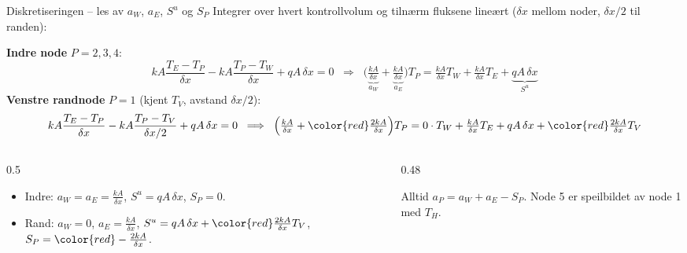 \documentclass[11pt,aspectratio=169]{beamer}
\begin{document}
\begin{frame}{Diskretiseringen -- les av $a_W$, $a_E$, $S^u$ og $S_P$}
\small
Integrer over hvert kontrollvolum og tilnærm fluksene lineært ($\delta x$ mellom noder, $\delta x/2$ til randen):

\medskip
\textbf{Indre node} $P = 2,3,4$:
\[
kA\frac{T_E - T_P}{\delta x} - kA\frac{T_P - T_W}{\delta x} + qA\,\delta x = 0
\;\;\Longrightarrow\;\;
\Big(\underbrace{\tfrac{kA}{\delta x}}_{a_W} + \underbrace{\tfrac{kA}{\delta x}}_{a_E}\Big)T_P
= \tfrac{kA}{\delta x}T_W + \tfrac{kA}{\delta x}T_E + \underbrace{qA\,\delta x}_{S^u}
\]
\textbf{Venstre randnode} $P = 1$ (kjent $T_V$, avstand $\delta x/2$):
\[
kA\frac{T_E - T_P}{\delta x} - kA\frac{T_P - T_V}{\delta x/2} + qA\,\delta x = 0
\;\;\Longrightarrow\;\;
\Big(\tfrac{kA}{\delta x} + {\color{red}\tfrac{2kA}{\delta x}}\Big)T_P
= 0\cdot T_W + \tfrac{kA}{\delta x}T_E + qA\,\delta x + {\color{red}\tfrac{2kA}{\delta x}T_V}
\]
\vspace{-2mm}
\begin{columns}[t]
\begin{column}{0.5\textwidth}
\begin{itemize}
\item Indre: $a_W = a_E = \frac{kA}{\delta x}$, $S^u = qA\,\delta x$, $S_P = 0$.
\item Rand: $a_W = 0$, $a_E = \frac{kA}{\delta x}$, $S^u = qA\,\delta x + {\color{red}\frac{2kA}{\delta x}T_V}$, $S_P = {\color{red}-\frac{2kA}{\delta x}}$.
\end{itemize}
\end{column}
\begin{column}{0.48\textwidth}
\begin{remb}{Alltid}
$a_P = a_W + a_E - S_P$. \; Node 5 er speilbildet av node 1 med $T_H$.
\end{remb}
\end{column}
\end{columns}
\end{frame}
\end{document}
